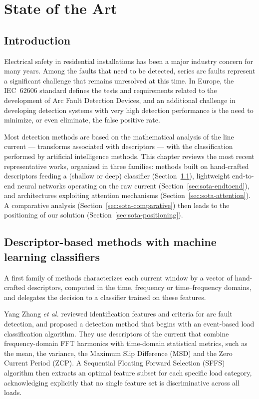 \chapter{State of the Art}
\label{chap:sota}

\section*{Introduction}

Electrical safety in residential installations has been a major industry concern for many years. Among the faults that need to be detected, series arc faults represent a significant challenge that remains unresolved at this time. In Europe, the IEC~62606 standard \cite{iec62606} defines the tests and requirements related to the development of Arc Fault Detection Devices, and an additional challenge in developing detection systems with very high detection performance is the need to minimize, or even eliminate, the false positive rate.

\medskip

Most detection methods are based on the mathematical analysis of the line current --- transforms associated with descriptors --- with the classification performed by artificial intelligence methods. This chapter reviews the most recent representative works, organized in three families: methods built on hand-crafted descriptors feeding a (shallow or deep) classifier (Section~\ref{sec:sota-descriptors}), lightweight end-to-end neural networks operating on the raw current (Section~\ref{sec:sota-endtoend}), and architectures exploiting attention mechanisms (Section~\ref{sec:sota-attention}). A comparative analysis (Section~\ref{sec:sota-comparative}) then leads to the positioning of our solution (Section~\ref{sec:sota-positioning}).

\section{Descriptor-based methods with machine learning classifiers}
\label{sec:sota-descriptors}

A first family of methods characterizes each current window by a vector of hand-crafted descriptors, computed in the time, frequency or time--frequency domains, and delegates the decision to a classifier trained on these features.

\medskip

Yang Zhang \emph{et al.} \cite{zhang2024event} reviewed identification features and criteria for arc fault detection, and proposed a detection method that begins with an event-based load classification algorithm. They use descriptors of the current that combine frequency-domain FFT harmonics with time-domain statistical metrics, such as the mean, the variance, the Maximum Slip Difference (MSD) and the Zero Current Period (ZCP). A Sequential Floating Forward Selection (SFFS) algorithm then extracts an optimal feature subset for each specific load category, acknowledging explicitly that no single feature set is discriminative across all loads.

